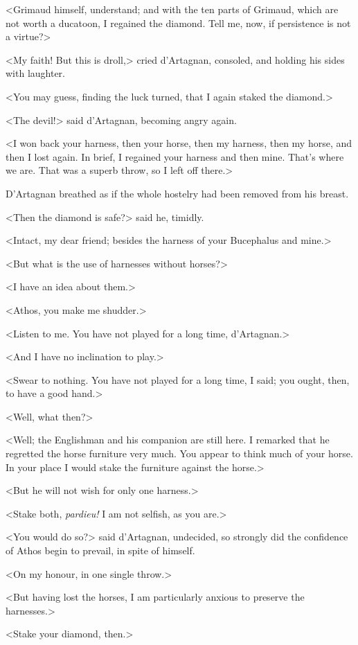 <Grimaud himself, understand; and with the ten parts of Grimaud, which are not worth a ducatoon, I regained the diamond. Tell me, now, if persistence is not a virtue?> 

<My faith! But this is droll,> cried d'Artagnan, consoled, and holding his sides with laughter. 

<You may guess, finding the luck turned, that I again staked the diamond.> 

<The devil!> said d'Artagnan, becoming angry again. 

<I won back your harness, then your horse, then my harness, then my horse, and then I lost again. In brief, I regained your harness and then mine. That's where we are. That was a superb throw, so I left off there.> 

D'Artagnan breathed as if the whole hostelry had been removed from his breast. 

<Then the diamond is safe?> said he, timidly. 

<Intact, my dear friend; besides the harness of your Bucephalus and mine.> 

<But what is the use of harnesses without horses?> 

<I have an idea about them.> 

<Athos, you make me shudder.> 

<Listen to me. You have not played for a long time, d'Artagnan.> 

<And I have no inclination to play.> 

<Swear to nothing. You have not played for a long time, I said; you ought, then, to have a good hand.> 

<Well, what then?> 

<Well; the Englishman and his companion are still here. I remarked that he regretted the horse furniture very much. You appear to think much of your horse. In your place I would stake the furniture against the horse.> 

<But he will not wish for only one harness.> 

<Stake both, \textit{pardieu!} I am not selfish, as you are.> 

<You would do so?> said d'Artagnan, undecided, so strongly did the confidence of Athos begin to prevail, in spite of himself. 

<On my honour, in one single throw.> 

<But having lost the horses, I am particularly anxious to preserve the harnesses.> 

<Stake your diamond, then.> 

